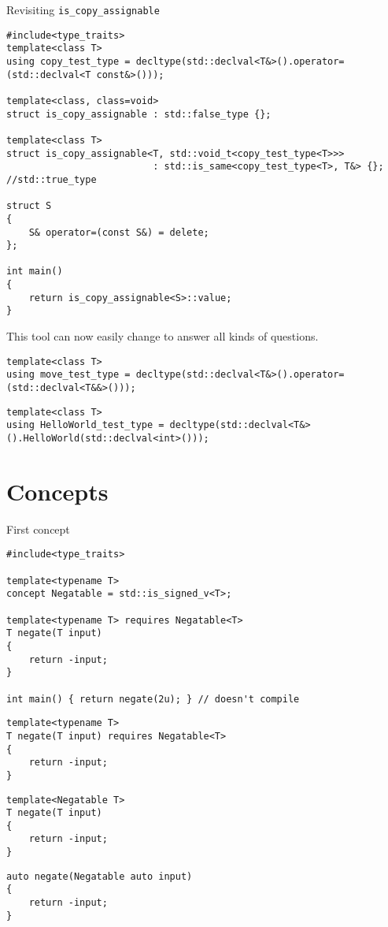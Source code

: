 \documentclass{beamer}
\begin{document}
\begin{frame}[fragile]{Revisiting \texttt{is\_copy\_assignable}}
\begin{lstlisting}
#include<type_traits>
template<class T>
using copy_test_type = decltype(std::declval<T&>().operator=(std::declval<T const&>()));

template<class, class=void>
struct is_copy_assignable : std::false_type {};

template<class T>
struct is_copy_assignable<T, std::void_t<copy_test_type<T>>>
						  : std::is_same<copy_test_type<T>, T&> {}; //std::true_type

struct S
{
	S& operator=(const S&) = delete;
};

int main()
{
	return is_copy_assignable<S>::value;
}
\end{lstlisting}
\pause
This tool can now easily change to answer all kinds of questions.
\begin{lstlisting}
template<class T>
using move_test_type = decltype(std::declval<T&>().operator=(std::declval<T&&>()));
\end{lstlisting}
\pause
\begin{lstlisting}
template<class T>
using HelloWorld_test_type = decltype(std::declval<T&>().HelloWorld(std::declval<int>()));
\end{lstlisting}
\end{frame}

\section{Concepts}
\begin{frame}[fragile]{First concept}
\begin{lstlisting}
#include<type_traits>

template<typename T>
concept Negatable = std::is_signed_v<T>;

template<typename T> requires Negatable<T>
T negate(T input)
{
	return -input;
}

int main() { return negate(2u); } // doesn't compile
\end{lstlisting}
\pause
\begin{lstlisting}
template<typename T>
T negate(T input) requires Negatable<T>
{
	return -input;
}
\end{lstlisting}
\pause
\begin{lstlisting}
template<Negatable T>
T negate(T input)
{
	return -input;
}
\end{lstlisting}
\pause
\begin{lstlisting}
auto negate(Negatable auto input)
{
	return -input;
}
\end{lstlisting}
\end{frame}
\end{document}
